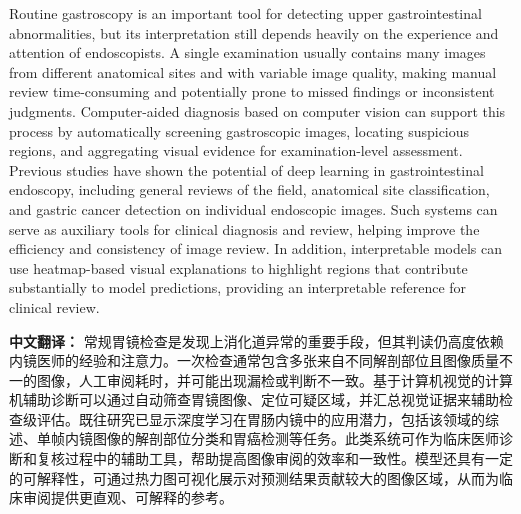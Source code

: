 \documentclass[Afour,sagev,times]{sagej}
\begin{document}
Routine gastroscopy is an important tool for detecting upper gastrointestinal abnormalities, but its interpretation still depends heavily on the experience and attention of endoscopists. A single examination usually contains many images from different anatomical sites and with variable image quality, making manual review time-consuming and potentially prone to missed findings or inconsistent judgments. Computer-aided diagnosis based on computer vision can support this process by automatically screening gastroscopic images, locating suspicious regions, and aggregating visual evidence for examination-level assessment. Previous studies have shown the potential of deep learning in gastrointestinal endoscopy, including general reviews of the field, anatomical site classification, and gastric cancer detection on individual endoscopic images.\cite{R1,R2,R3} Such systems can serve as auxiliary tools for clinical diagnosis and review, helping improve the efficiency and consistency of image review. In addition, interpretable models can use heatmap-based visual explanations to highlight regions that contribute substantially to model predictions, providing an interpretable reference for clinical review.

\textbf{中文翻译：} 常规胃镜检查是发现上消化道异常的重要手段，但其判读仍高度依赖内镜医师的经验和注意力。一次检查通常包含多张来自不同解剖部位且图像质量不一的图像，人工审阅耗时，并可能出现漏检或判断不一致。基于计算机视觉的计算机辅助诊断可以通过自动筛查胃镜图像、定位可疑区域，并汇总视觉证据来辅助检查级评估。既往研究已显示深度学习在胃肠内镜中的应用潜力，包括该领域的综述、单帧内镜图像的解剖部位分类和胃癌检测等任务。此类系统可作为临床医师诊断和复核过程中的辅助工具，帮助提高图像审阅的效率和一致性。模型还具有一定的可解释性，可通过热力图可视化展示对预测结果贡献较大的图像区域，从而为临床审阅提供更直观、可解释的参考。
\end{document}
